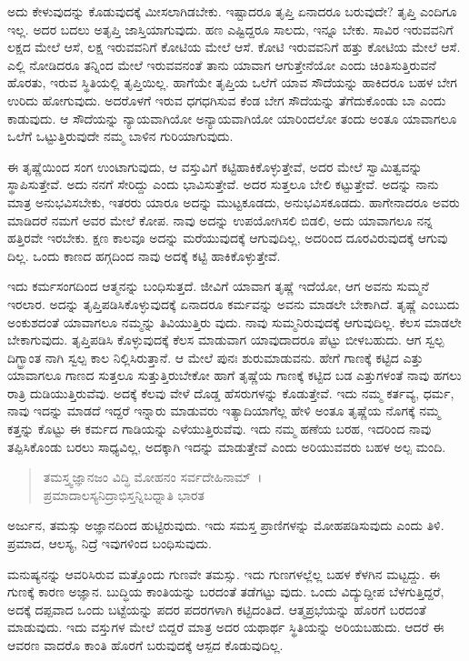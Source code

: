 ಅದು ಕೇಳುವುದನ್ನು ಕೊಡುವುದಕ್ಕೆ ಮೀಸಲಾಗಿಡಬೇಕು. ಇಷ್ಟಾದರೂ ತೃಪ್ತಿ ಏನಾದರೂ ಬರುವುದೇ? ತೃಪ್ತಿ ಎಂದಿಗೂ ಇಲ್ಲ. ಅದರ ಬದಲು ಅತೃಪ್ತಿ ಜಾಸ್ತಿಯಾಗುವುದು. ಹಣ ಎಷ್ಟಿದ್ದರೂ ಸಾಲದು, ಇನ್ನೂ ಬೇಕು. ಸಾವಿರ ಇರುವವನಿಗೆ ಲಕ್ಷದ ಮೇಲೆ ಆಸೆ, ಲಕ್ಷ ಇರುವವನಿಗೆ ಕೋಟಿಯ ಮೇಲೆ ಆಸೆ. ಕೋಟಿ ಇರುವವನಿಗೆ ಹತ್ತು ಕೋಟಿಯ ಮೇಲೆ ಆಸೆ. ಎಲ್ಲಿ ನೋಡಿದರೂ ತನ್ನಿಂದ ಮೇಲೆ ಇರುವವನಂತೆ ತಾನು ಯಾವಾಗ ಆಗುತ್ತೇನೆಯೋ ಎಂದು ಚಿಂತಿಸುತ್ತಿರುವನೆ ಹೊರತು, ಇರುವ ಸ್ಥಿತಿಯಲ್ಲಿ ತೃಪ್ತಿಯಿಲ್ಲ. ಹಾಗೆಯೇ ತೃಪ್ತಿಯ ಒಲೆಗೆ ಯಾವ ಸೌದೆಯನ್ನು ಹಾಕಿದರೂ ಬಹಳ ಬೇಗ ಉರಿದು ಹೋಗುವುದು. ಅದರೊಳಗೆ ಇರುವ ಧಗಧಗಿಸುವ ಕೆಂಡ ಬೇಗ ಸೌದೆಯನ್ನು ತೆಗೆದುಕೊಂಡು ಬಾ ಎಂದು ಕಾಡುವುದು. ಆ ಸೌದೆಯನ್ನು ನ್ಯಾಯವಾಗಿಯೋ ಅನ್ಯಾಯವಾಗಿಯೋ ಯಾರಿಂದಲೋ ತಂದು ಅಂತೂ ಯಾವಾಗಲೂ ಒಲೆಗೆ ಒಟ್ಟುತ್ತಿರುವುದೇ ನಮ್ಮ ಬಾಳಿನ ಗುರಿಯಾಗುವುದು.

ಈ ತೃಷ್ಣೆಯಿಂದ ಸಂಗ ಉಂಟಾಗುವುದು, ಆ ವಸ್ತುವಿಗೆ ಕಟ್ಟಿಹಾಕಿಕೊಳ್ಳುತ್ತೇವೆ, ಅದರ ಮೇಲೆ ಸ್ವಾಮಿತ್ವವನ್ನು ಸ್ಥಾಪಿಸುತ್ತೇವೆ. ಅದು ನನಗೆ ಸೇರಿದ್ದು ಎಂದು ಭಾವಿಸುತ್ತೇವೆ. ಅದರ ಸುತ್ತಲೂ ಬೇಲಿ ಕಟ್ಟುತ್ತೇವೆ. ಅದನ್ನು ನಾನು ಮಾತ್ರ ಅನುಭವಿಸಬೇಕು, ಇತರರು ಯಾರೂ ಅದನ್ನು ಮುಟ್ಟಕೂಡದು, ಅನುಭವಿಸಕೂಡದು. ಹಾಗೇನಾದರೂ ಅವರು ಮಾಡಿದರೆ ನಮಗೆ ಅವರ ಮೇಲೆ ಕೋಪ. ನಾವು ಅದನ್ನು ಉಪಯೋಗಿಸಲಿ ಬಿಡಲಿ, ಅದು ಯಾವಾಗಲೂ ನನ್ನ ಹತ್ತಿರವೇ ಇರಬೇಕು. ಕ್ಷಣ ಕಾಲವೂ ಅದನ್ನು ಮರೆಯುವುದಕ್ಕೆ ಆಗುವುದಿಲ್ಲ, ಅದರಿಂದ ದೂರವಿರುವುದಕ್ಕೆ ಆಗುವು ದಿಲ್ಲ. ಒಂದು ಕಾಣದ ಹಗ್ಗದಿಂದ ನಾವು ಅದಕ್ಕೆ ಕಟ್ಟಿ ಹಾಕಿಕೊಳ್ಳುತ್ತೇವೆ.

ಇದು ಕರ್ಮಸಂಗದಿಂದ ಆತ್ಮನನ್ನು ಬಂಧಿಸುತ್ತದೆ. ಜೀವಿಗೆ ಯಾವಾಗ ತೃಷ್ಣೆ ಇದೆಯೋ, ಆಗ ಅವನು ಸುಮ್ಮನೆ ಇರಲಾರ. ಅದನ್ನು ತೃಪ್ತಿಪಡಿಸಿಕೊಳ್ಳುವುದಕ್ಕೆ ಏನಾದರೂ ಕರ್ಮವನ್ನು ಅವನು ಮಾಡಲೇ ಬೇಕಾಗಿದೆ. ತೃಷ್ಣೆ ಎಂಬುದು ಅಂಕುಶದಂತೆ ಯಾವಾಗಲೂ ನಮ್ಮನ್ನು ತಿವಿಯುತ್ತಿರು ವುದು. ನಾವು ಸುಮ್ಮನಿರುವುದಕ್ಕೆ ಆಗುವುದಿಲ್ಲ. ಕೆಲಸ ಮಾಡಲೇ ಬೇಕಾಗುವುದು. ತೃಪ್ತಿಪಡಿಸಿ ಕೊಳ್ಳುವುದಕ್ಕೆ ಕೆಲಸ ಮಾಡುವಾಗ ಯಾವುದಾದರೂ ಪೆಟ್ಟು ಬೀಳಬಹುದು. ಆಗ ಸ್ವಲ್ಪ ದಿಗ್ಭ್ರಾಂತ ನಾಗಿ ಸ್ವಲ್ಪ ಕಾಲ ನಿಲ್ಲಿಸಿರುತ್ತಾನೆ. ಆ ಮೇಲೆ ಪುನಃ ಶುರುಮಾಡುವನು. ಹೇಗೆ ಗಾಣಕ್ಕೆ ಕಟ್ಟಿದ ಎತ್ತು ಯಾವಾಗಲೂ ಗಾಣದ ಸುತ್ತಲೂ ಸುತ್ತುತ್ತಿರುಬೇಕೋ ಹಾಗೆ ತೃಷ್ಣೆಯ ಗಾಣಕ್ಕೆ ಕಟ್ಟಿದ ಬಡ ಎತ್ತುಗಳಂತೆ ನಾವು ಹಗಲು ರಾತ್ರಿ ದುಡಿಯುತ್ತಿರುವೆವು. ಅದಕ್ಕೆ ಕೆಲವು ವೇಳೆ ದೊಡ್ಡ ಹೆಸರುಗಳನ್ನು ಕೊಡುತ್ತೇವೆ. ಇದು ನಮ್ಮ ಕರ್ತವ್ಯ, ಧರ್ಮ, ನಾವು ಇದನ್ನು ಮಾಡದೆ ಇದ್ದರೆ ಇನ್ನಾರು ಮಾಡುವರು ಇತ್ಯಾದಿಯಾಗೆಲ್ಲ ಹೇಳಿ ಅಂತೂ ತೃಷ್ಣೆಯ ನೊಗಕ್ಕೆ ನಮ್ಮ ಕತ್ತನ್ನು ಕೊಟ್ಟು ಈ ಕರ್ಮದ ಗಾಡಿಯನ್ನು ಎಳೆಯುತ್ತಿರುವೆವು. ಇದು ನಮ್ಮ ಹಣೆಯ ಬರಹ, ಇದರಿಂದ ನಾವು ತಪ್ಪಿಸಿಕೊಂಡು ಬರಲು ಸಾಧ್ಯವಿಲ್ಲ, ಅದಕ್ಕಾಗಿ ಇದನ್ನು ಮಾಡುತ್ತೇವೆ ಎಂದು ಅರಿಯುವವರು ಬಹಳ ಅಲ್ಪ ಮಂದಿ.

\begin{verse}
ತಮಸ್ತ್ವಜ್ಞಾನಜಂ ವಿದ್ಧಿ ಮೋಹನಂ ಸರ್ವದೇಹಿನಾಮ್~।\\ಪ್ರಮಾದಾಲಸ್ಯನಿದ್ರಾಭಿಸ್ತನ್ನಿಬಧ್ನಾತಿ ಭಾರತ 
\end{verse}

{\small ಅರ್ಜುನ, ತಮಸ್ಸು ಅಜ್ಞಾನದಿಂದ ಹುಟ್ಟಿರುವುದು. ಇದು ಸಮಸ್ತ ಪ್ರಾಣಿಗಳನ್ನು ಮೋಹಪಡಿಸುವುದು ಎಂದು ತಿಳಿ. ಪ್ರಮಾದ, ಆಲಸ್ಯ, ನಿದ್ರೆ ಇವುಗಳಿಂದ ಬಂಧಿಸುವುದು.}

ಮನುಷ್ಯನನ್ನು ಆವರಿಸಿರುವ ಮತ್ತೊಂದು ಗುಣವೇ ತಮಸ್ಸು. ಇದು ಗುಣಗಳಲ್ಲೆಲ್ಲ ಬಹಳ ಕೆಳಗಿನ ಮಟ್ಟದ್ದು. ಈ ಗುಣಕ್ಕೆ ಕಾರಣ ಅಜ್ಞಾನ. ಬುದ್ಧಿಯ ಕಾಂತಿಯನ್ನು ಬರದಂತೆ ತಡೆಗಟ್ಟು ವುದು. ಒಂದು ವಿದ್ಯುದ್ದೀಪ ಬೆಳಗುತ್ತಿದ್ದರೆ, ಅದಕ್ಕೆ ದಪ್ಪವಾದ ಒಂದು ಬಟ್ಟೆಯನ್ನು ಪದರ ಪದರಗಳಾಗಿ ಕಟ್ಟಿದಂತಿದೆ. ಆತ್ಮಪ್ರಭೆಯನ್ನು ಹೊರಗೆ ಬರದಂತೆ ಮಾಡುವುದು. ಇದು ವಸ್ತುಗಳ ಮೇಲೆ ಬಿದ್ದರೆ ಮಾತ್ರ ಅದರ ಯಥಾರ್ಥ ಸ್ಥಿತಿಯನ್ನು ಅರಿಯಬಹುದು. ಆದರೆ ಈ ಆವರಣ ವಾದರೊ ಕಾಂತಿ ಹೊರಗೆ ಬರುವುದಕ್ಕೆ ಆಸ್ಪದ ಕೊಡುವುದಿಲ್ಲ.

